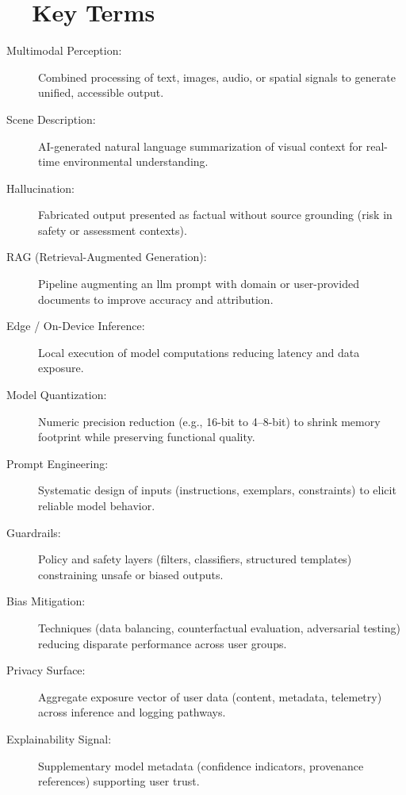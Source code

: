 \section{~~Key Terms}\label{ch9:sec:key-terms}
\begin{description}
	\item[Multimodal Perception:] Combined processing of text, images, audio, or spatial signals to generate unified, accessible output.\supercite{SeeingAI}
	\item[Scene Description:] AI-generated natural language summarization of visual context for real-time environmental understanding.\supercite{msseeingai}
	\item[Hallucination:] Fabricated output presented as factual without source grounding (risk in safety or assessment contexts).\supercite{aimodels2024}
	\item[RAG (Retrieval-Augmented Generation):] Pipeline augmenting an \gls{llm} prompt with domain or user-provided documents to improve accuracy and attribution.
	\item[Edge / On-Device Inference:] Local execution of model computations reducing latency and data exposure.\supercite{LlamaCpp, Llamafile}
	\item[Model Quantization:] Numeric precision reduction (e.g., 16-bit to 4–8-bit) to shrink memory footprint while preserving functional quality.
	\item[Prompt Engineering:] Systematic design of inputs (instructions, exemplars, constraints) to elicit reliable model behavior.
	\item[Guardrails:] Policy and safety layers (filters, classifiers, structured templates) constraining unsafe or biased outputs.\supercite{AI_Ethics_Bias}
	\item[Bias Mitigation:] Techniques (data balancing, counterfactual evaluation, adversarial testing) reducing disparate performance across user groups.\supercite{Bias_in_AI}
	\item[Privacy Surface:] Aggregate exposure vector of user data (content, metadata, telemetry) across inference and logging pathways.\supercite{DataPrivacyAI}
	\item[Explainability Signal:] Supplementary model metadata (confidence indicators, provenance references) supporting user trust.\supercite{AI_Ethics_Bias}
\end{description}

